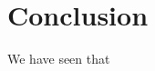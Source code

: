 \documentclass[12pt,a4paper]{article}
\begin{document}


\section{Conclusion}

We have seen that

\section{}




\end{document}
